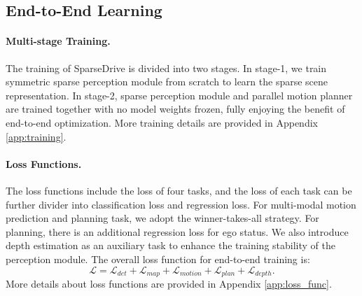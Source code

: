 \subsection{End-to-End Learning}
\paragraph{Multi-stage Training.}
The training of SparseDrive is divided into two stages. In stage-1, we train symmetric sparse perception module from scratch to learn the sparse scene representation. In stage-2, sparse perception module and parallel motion planner are trained together with no model weights frozen, fully enjoying the benefit of end-to-end optimization. More training details are provided in Appendix \ref{app:training}.

\paragraph{Loss Functions.}
The loss functions include the loss of four tasks, and the loss of each task can be further divider into classification loss and regression loss. For multi-modal motion prediction and planning task, we adopt the winner-takes-all strategy. For planning, there is an additional regression loss for ego status. We also introduce depth estimation as an auxiliary task to enhance the training stability of the perception module. The overall loss function for end-to-end training is: 
\begin{equation}
\mathcal{L}=\mathcal{L}_{det}+\mathcal{L}_{map}+\mathcal{L}_{motion}+\mathcal{L}_{plan}+\mathcal{L}_{depth}.
\end{equation}
More details about loss functions are provided in Appendix \ref{app:loss_func}.
